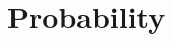          \chapter{Probability}
    \setcounter{figure}{1}
    \setcounter{subfigure}{1}
    \label{0bb9905f9f275884255abbf74a951a4a}
%     
%     
%     
%     
%     
%     
%   
%             
%       
